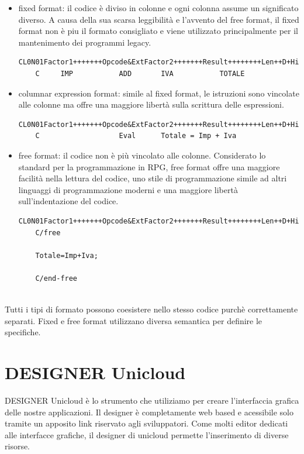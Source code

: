 \documentclass[target=bach,aauheader=,style=]{thud}
\begin{document}
\begin{itemize}
    \item fixed format: il codice è diviso in colonne e ogni colonna assume un significato diverso.
    A causa della sua scarsa leggibilità e l'avvento del free format, il fixed format non è piu il formato consigliato e viene utilizzato principalmente per il mantenimento dei programmi legacy.
    \begin{lstlisting}[language=RPG, caption=Codice RPG in fixed format, label=lst:rpgfixed]
    CL0N01Factor1+++++++Opcode&ExtFactor2+++++++Result++++++++Len++D+HiLoEq...
    C     IMP           ADD       IVA           TOTALE
    \end{lstlisting}
    \item columnar expression format: simile al fixed format, le istruzioni sono vincolate alle colonne ma offre una maggiore libertà sulla scrittura delle espressioni.
    \begin{lstlisting}[language=RPG, caption=Codice RPG in columnar expression format, label=lst:rpgcolumnar]
    CL0N01Factor1+++++++Opcode&ExtFactor2+++++++Result++++++++Len++D+HiLoEq...
    C                   Eval      Totale = Imp + Iva
    \end{lstlisting}
    \item free format: il codice non è più vincolato alle colonne. Considerato lo standard per la programmazione in RPG, free format offre una maggiore facilità nella lettura del codice, uno stile di programmazione simile ad altri linguaggi di programmazione moderni e una maggiore libertà sull'indentazione del codice.
    \begin{lstlisting}[language=RPG, caption=Codice RPG in free format, label=lst:rpgfree]
    CL0N01Factor1+++++++Opcode&ExtFactor2+++++++Result++++++++Len++D+HiLoEq...
    C/free

    Totale=Imp+Iva;

    C/end-free
    
    \end{lstlisting}
     
\end{itemize} 

Tutti i tipi di formato possono coesistere nello stesso codice purchè correttamente separati.
Fixed e free format utilizzano diversa semantica per definire le specifiche.

\section{DESIGNER Unicloud}
DESIGNER Unicloud è lo strumento che utiliziamo per creare l'interfaccia grafica delle nostre applicazioni.
Il designer è completamente web based e acessibile solo tramite un apposito link riservato agli sviluppatori.
Come molti editor dedicati alle interfacce grafiche, il designer di unicloud permette l'inserimento di diverse risorse.
\end{document}
